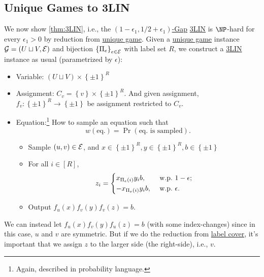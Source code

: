 \subsection{Unique Games to 3LIN}
We now show \autoref{thm:3LIN}, i.e., the \hyperref[def:c-s-Gap]{\((1 - \epsilon_1 , 1 / 2 + \epsilon_1 )\)-Gap} \hyperref[prb:max-3LIN]{3LIN} is \(\NP\)-hard for every \(\epsilon _1 > 0\) by reduction from \hyperref[prb:unique-game]{unique game}. Given a \hyperref[prb:unique-game]{unique game} instance \(\mathcal{\MakeUppercase{g}} =(U \sqcup V, \mathcal{\MakeUppercase{e}} )\) and bijection \(\left\{ \Pi _e \right\}_{e\in \mathcal{\MakeUppercase{e}} } \) with label set \(R\), we construct a \hyperref[prb:max-3LIN]{3LIN} instance as usual (parametrized by \(\epsilon \)):
\begin{itemize}
	\item Variable: \((U \sqcup V) \times \left\{ \pm 1 \right\} ^R\)
	\item Assignment: \(C_v = \left\{ v \right\} \times \left\{ \pm 1 \right\} ^R\). And given assignment, \(f_v \colon \left\{ \pm 1 \right\} ^R \to \left\{ \pm 1 \right\} \) be assignment restricted to \(C_v\).
	\item Equation:\footnote{Again, described in probability language.} How to sample an equation such that
	      \[
		      w(\text{eq.}) = \Pr_{}(\text{eq. is sampled} ).
	      \]
	      \begin{itemize}
		      \item Sample \((u, v)\in \mathcal{\MakeUppercase{e}} \), and \(x\in \left\{ \pm 1 \right\} ^R, y\in \left\{ \pm 1 \right\} ^R, b\in \left\{ \pm 1 \right\} \)
		      \item For all \(i\in [R]\),
		            \[
			            z_i = \begin{dcases}
				            x_{\Pi_e (i)} y_i b,  & \text{ w.p.\  } 1-\epsilon  ; \\
				            -x_{\Pi_e (i)} y_i b, & \text{ w.p.\  } \epsilon  .
			            \end{dcases}
		            \]
		      \item Output \(f_u(x) f_v(y) f_v(z) = b\).
	      \end{itemize}
\end{itemize}

\begin{remark}
	We can instead let \(f_u(x) f_v(y) f_u(z) = b\) (with some index-changes) since in this case, \(u\) and \(v\) are symmetric. But if we do the reduction from \hyperref[prb:label-cover]{label cover}, it's important that we assign \(z\) to the larger side (the right-side), i.e., \(v\).
\end{remark}


